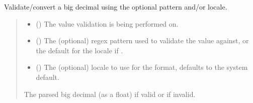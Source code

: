 \documentclass[letterpaper,10pt,english]{sphinxmanual}
\begin{document}
\begin{fulllineitems}
\begin{fulllineitems}
\label{\detokenize{apache_commons_validator_python.routines:apache_commons_validator_python.routines.big_decimal_validator.BigDecimalValidator.validate}}
\pysigstartsignatures
{}
\pysigstopsignatures
\sphinxAtStartPar
Validate/convert a big decimal using the optional pattern and/or locale.
\begin{quote}\begin{description}
\begin{itemize}
\item {} 
\sphinxAtStartPar
{} () \textendash{} The value validation is being performed on.

\item {} 
\sphinxAtStartPar
{} () \textendash{} The (optional) regex pattern used to validate the value against,
or the default for the locale if .

\item {} 
\sphinxAtStartPar
{} () \textendash{} The (optional) locale to use for the format, defaults to the system default.

\end{itemize}

\sphinxAtStartPar
The parsed big decimal (as a float) if valid or  if invalid.

\end{description}\end{quote}

\end{fulllineitems}


\end{fulllineitems}
\end{document}
